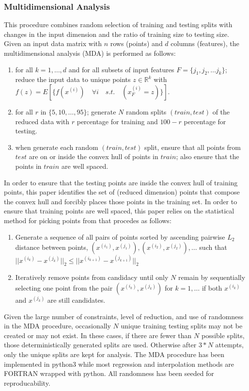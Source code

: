 \documentclass{scspaperproc}
\theoremstyle{scsthe}
\begin{document}
\subsubsection{Multidimensional Analysis}
This procedure combines random selection of training and testing
splits with changes in the input dimension and the ratio of training
size to testing size. Given an input data matrix with $n$ rows
(points) and $d$ columns (features), the multidimensional analysis
(MDA) is performed as follows:
\begin{enumerate}
\item for all $k = 1, \ldots, d$ and for all subsets of input features
  $F = \{ j_1, j_2, \ldots j_k \}$; reduce the input data to unique
  points $z \in \mathbb{R}^k$ with $f(z) = E[ \{ f(x^{(i)}) \quad
    \forall i \quad s.t. \quad (x^{(i)}_F = z) \} ]$.
\item for all $r$ in $\{5, 10, \ldots, 95\}$; generate $N$ random
  splits $(train, test)$ of the reduced data with $r$ percentage for
  training and $100 - r$ percentage for testing.
\item when generate each random $(train, test)$ split, ensure that all
  points from $test$ are on or inside the convex hull of points in
  $train$; also ensure that the points in $train$ are well spaced.
\end{enumerate}

In order to ensure that the testing points are inside the convex hull
of training points, this paper identifies the set of (reduced
dimension) points that compose the convex hull and forcibly places
those points in the training set. In order to ensure that training
points are well spaced, this paper relies on the statistical method
for picking points from  that procedes
as follows:
\begin{enumerate}
\item Generate a sequence of all pairs of points sorted by ascending
  pairwise $L_2$ distance between points, ${(x^{(i_1)},x^{(j_1)}),
    (x^{(i_2)},x^{(j_2)}), \ldots}$ such that
  $||x^{(i_k)}-x^{(j_k)}||_2 \leq ||x^{(i_{k+1})}-x^{(j_{k+1})}||_2$
\item Iteratively remove points from candidacy until only $N$ remain
  by sequentially selecting one point from the pair $(x^{(i_k)},
  x^{(j_k)})$ for $k = 1,\ldots$ if both $x^{(i_k)}$ and $x^{(j_k)}$
  are still candidates.
\end{enumerate}

Given the large number of constraints, level of reduction, and use of
randomness in the MDA procedure, occasionally $N$ unique training
testing splits may not be created or may not exist. In these cases, if
there are fewer than $N$ possible splits, those deterministically
generated splits are used. Otherwise after $3*N$ attempts, only the
unique splits are kept for analysis. The MDA procedure has been
implemented in python3 while most regression and interpolation methods
are FORTRAN wrapped with python. All randomness has been seeded for
reproducability.
\end{document}
